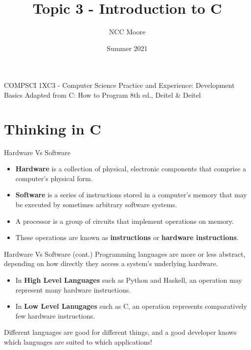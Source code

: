 \documentclass[11pt]{beamer}
\author{NCC Moore}
\title{Topic 3 - Introduction to C}
\institute{McMaster University}
\date{Summer 2021}
\begin{document}
\begin{frame}
\center
COMPSCI 1XC3 - Computer Science Practice and Experience:
Development Basics
\titlepage
Adapted from C: How to Program 8th ed., Deitel \& Deitel
\end{frame}

\begin{frame}
\tableofcontents
\end{frame}

\section[Intro]{Thinking in C}
\begin{frame}{Hardware Vs Software}
\begin{itemize}
\item \textbf{Hardware} is a collection of physical, electronic components that comprise a computer's physical form.
\item \textbf{Software} is a series of instructions stored in a computer's memory that may be executed by sometimes arbitrary software systems.  
\item A processor is a group of circuits that implement operations on memory.
\item These operations are known as \textbf{instructions} or \textbf{hardware instructions}.
\end{itemize}
\end{frame}

\begin{frame}{Hardware Vs Software (cont.)}
Programming languages are more or less abstract, depending on how directly they access a system's underlying hardware.  
\begin{itemize}
\item In \textbf{High Level Languages} such as Python and Haskell, an operation may represent many hardware instructions.
\item In \textbf{Low Level Lanugages} such as C, an operation represents comparatively few hardware instructions.  
\end{itemize}
Different languages are good for different things, and a good developer knows which languages are suited to which applications! 
\end{frame}
\end{document}
